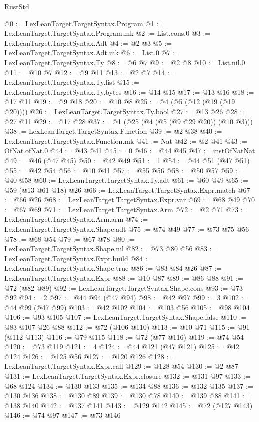 \begin{lexlean}{RustStd}
\begin{coremodule}
@0 := LexLeanTarget.TargetSyntax.Program
@1 := LexLeanTarget.TargetSyntax.Program.mk
@2 := List.cons.{0}
@3 := LexLeanTarget.TargetSyntax.Adt
@4 := @2 @3
@5 := LexLeanTarget.TargetSyntax.Adt.mk
@6 := List.{0}
@7 := LexLeanTarget.TargetSyntax.Ty
@8 := @6 @7
@9 := @2 @8
@10 := List.nil.{0}
@11 := @10 @7
@12 := @9 @11
@13 := @2 @7
@14 := LexLeanTarget.TargetSyntax.Ty.list
@15 := LexLeanTarget.TargetSyntax.Ty.bytes
@16 := @14 @15
@17 := @13 @16
@18 := @17 @11
@19 := @9 @18
@20 := @10 @8
@25 := @4 (@5 (@12 (@19 (@19 @20))))
@26 := LexLeanTarget.TargetSyntax.Ty.bool
@27 := @13 @26
@28 := @27 @11
@29 := @17 @28
@37 := @1 (@25 (@4 (@5 (@9 @29 @20)) (@10 @3)))
@38 := LexLeanTarget.TargetSyntax.Function
@39 := @2 @38
@40 := LexLeanTarget.TargetSyntax.Function.mk
@41 := Nat
@42 := @2 @41
@43 := OfNat.ofNat.{0}
@44 := @43 @41
@45 := 0
@46 := @44 @45
@47 := instOfNatNat
@49 := @46 (@47 @45)
@50 := @42 @49
@51 := 1
@54 := @44 @51 (@47 @51)
@55 := @42 @54
@56 := @10 @41
@57 := @55 @56
@58 := @50 @57
@59 := @40 @58
@60 := LexLeanTarget.TargetSyntax.Ty.adt
@61 := @60 @49
@65 := @59 (@13 @61 @18) @26
@66 := LexLeanTarget.TargetSyntax.Expr.match
@67 := @66 @26
@68 := LexLeanTarget.TargetSyntax.Expr.var
@69 := @68 @49
@70 := @67 @69
@71 := LexLeanTarget.TargetSyntax.Arm
@72 := @2 @71
@73 := LexLeanTarget.TargetSyntax.Arm.arm
@74 := LexLeanTarget.TargetSyntax.Shape.adt
@75 := @74 @49
@77 := @73 @75 @56
@78 := @68 @54
@79 := @67 @78
@80 := LexLeanTarget.TargetSyntax.Shape.nil
@82 := @73 @80 @56
@83 := LexLeanTarget.TargetSyntax.Expr.build
@84 := LexLeanTarget.TargetSyntax.Shape.true
@86 := @83 @84 @26
@87 := LexLeanTarget.TargetSyntax.Expr
@88 := @10 @87
@89 := @86 @88
@91 := @72 (@82 @89)
@92 := LexLeanTarget.TargetSyntax.Shape.cons
@93 := @73 @92
@94 := 2
@97 := @44 @94 (@47 @94)
@98 := @42 @97
@99 := 3
@102 := @44 @99 (@47 @99)
@103 := @42 @102
@104 := @103 @56
@105 := @98 @104
@106 := @93 @105
@107 := LexLeanTarget.TargetSyntax.Shape.false
@110 := @83 @107 @26 @88
@112 := @72 (@106 @110)
@113 := @10 @71
@115 := @91 (@112 @113)
@116 := @79 @115
@118 := @72 (@77 @116)
@119 := @74 @54
@120 := @73 @119
@121 := 4
@124 := @44 @121 (@47 @121)
@125 := @42 @124
@126 := @125 @56
@127 := @120 @126
@128 := LexLeanTarget.TargetSyntax.Expr.call
@129 := @128 @54
@130 := @2 @87
@131 := LexLeanTarget.TargetSyntax.Expr.closure
@132 := @131 @97
@133 := @68 @124
@134 := @130 @133
@135 := @134 @88
@136 := @132 @135
@137 := @130 @136
@138 := @130 @89
@139 := @130 @78
@140 := @139 @88
@141 := @138 @140
@142 := @137 @141
@143 := @129 @142
@145 := @72 (@127 @143)
@146 := @74 @97
@147 := @73 @146

\end{coremodule}
\end{lexlean}
